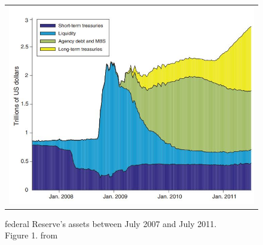 \documentclass{amsart}
\theoremstyle{definition}
\theoremstyle{remark}
\numberwithin{equation}{section}
\begin{document}
\begin{figure}[h!]
    \centering
    \begin{tabular}{c}
        \includegraphics[width=0.8 \textwidth]{fedsheet.JPG}
    \end{tabular}
    \caption{federal Reserve's assets between July 2007 and July 2011.\\ Figure 1. from \cite{del2017great}}
    \label{fig:fedsheet}
\end{figure}
\end{document}
